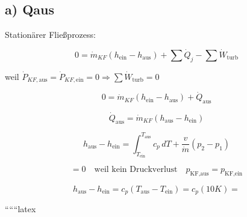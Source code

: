 \subsection*{a) Qaus}

Stationärer Fließprozess:

\[
0 = \dot{m}_{KF} (h_{\text{ein}} - h_{\text{aus}}) + \sum \dot{Q}_j - \sum \dot{W}_{\text{turb}}
\]

weil \(\dot{P}_{KF,\text{aus}} = \dot{P}_{KF,\text{ein}} = 0 \Rightarrow \sum \dot{W}_{\text{turb}} = 0\)

\[
0 = \dot{m}_{KF} (h_{\text{ein}} - h_{\text{aus}}) + \dot{Q}_{\text{aus}}
\]

\[
\dot{Q}_{\text{aus}} = \dot{m}_{KF} (h_{\text{aus}} - h_{\text{ein}})
\]

\[
h_{\text{aus}} - h_{\text{ein}} = \int_{T_{\text{ein}}}^{T_{\text{aus}}} c_p \, dT + \frac{v}{\dot{m}} (p_2 - p_1)
\]

\[
= 0 \quad \text{weil kein Druckverlust} \quad p_{\text{KF,aus}} = p_{\text{KF,ein}}
\]

\[
h_{\text{aus}} - h_{\text{ein}} = c_p (T_{\text{aus}} - T_{\text{ein}}) = c_p (10K) =
\]

``````latex